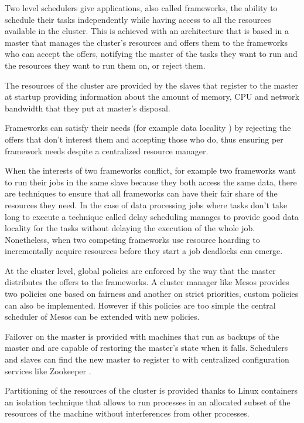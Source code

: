 \documentclass{article}                     %
\begin{document}
Two level schedulers give applications, also called
frameworks, the ability to schedule their tasks independently while
having access to all the resources available in the cluster. This
is achieved with an architecture that is based in a master that manages
the cluster's resources and offers them to the frameworks who can accept 
the offers, notifying the master of the tasks they want to run and the
resources they want to run them on, or reject them.

The resources of the cluster are provided by the slaves that register to 
the master at startup providing information about the amount of memory, CPU
and network bandwidth  that they put at master's disposal.  

Frameworks can satisfy their needs (for example data locality \cite{chung_maximizing_2006} ) by 
rejecting the offers that don't interest them and accepting those who do, thus
ensuring per framework needs despite a centralized resource manager. 

When the interests of two frameworks conflict, for example two
frameworks want to run their jobs in the same slave because they both
access the same data, there are techniques to ensure that all
frameworks can have their fair share of the resources they need. In
the case of data processing jobs where tasks don't take long to
execute a technique called delay scheduling \cite{zaharia_delay_2010}
manages to provide good data locality for the tasks without delaying
the execution of the whole job. Nonetheless, when two competing
frameworks use resource hoarding to incrementally acquire resources
before they start a job deadlocks can emerge.

At the cluster level, global policies are enforced by the way that the
master distributes the offers to the frameworks. A cluster manager
like Mesos \cite{Hindman10mesos:a} provides two policies one based on
fairness \cite{AjtaiANRSW1998} and another on strict priorities,
custom policies can also be implemented. However if this policies are
too simple the central scheduler of Mesos can be extended with new
policies.

Failover on the master is provided with machines that run as backups of the master and
are capable of restoring the master's state when it falls. Schedulers and slaves can find
the new master to register to with centralized configuration services like Zookeeper \cite{_apache_????}.

Partitioning of the resources of the cluster is provided thanks to Linux containers \cite{_linux_????}
an isolation technique that allows to run processes in an allocated subset of the 
resources of the machine without interferences from other processes. 
\end{document}
